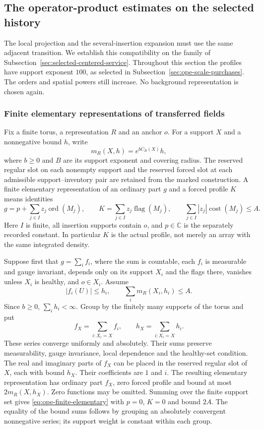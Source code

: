 \subsection{The operator-product estimates on the selected history}
\label{sec:ope-history-service}

The local projection and the several-insertion expansion must use the
same adjacent transition. We establish this compatibility on the family
of Subsection~\ref{sec:selected-centered-service}. Throughout this section
the profiles have support exponent $100$, as selected in
Subsection~\ref{sec:ope-scale-purchases}. The orders and spatial powers
still increase. No background representation is chosen again.

\subsubsection{Finite elementary representations of transferred fields}

Fix a finite torus, a representation $R$ and an anchor $o$. For a support
$X$ and a nonnegative bound $h$, write
\[
                  m_R(X,h)=e^{b C_B(X)}h,
\]
where $b\ge0$ and $B$ are its support exponent and covering radius.
The reserved regular slot on each nonempty support and the reserved
forced slot at each admissible support--inventory pair are retained
from the marked construction. A finite elementary representation of
an ordinary part $g$ and a forced profile $K$ means identities
\begin{equation}\label{eq:ope-finite-elementary}
 g=p+\sum_{j\in I}z_j\operatorname{ord}(M_j),\qquad
 K=\sum_{j\in I}z_j\operatorname{flag}(M_j),\qquad
 \sum_{j\in I}|z_j|\operatorname{cost}(M_j)\le A.
\end{equation}
Here $I$ is finite, all insertion supports contain $o$, and $p\in\mathbb C$
is the separately recorded constant. In particular $K$ is the actual
profile, not merely an array with the same integrated density.

Suppose first that $g=\sum_i f_i$, where the sum is countable, each
$f_i$ is measurable and gauge invariant, depends only on its support
$X_i$ and the flags there, vanishes unless $X_i$ is healthy, and
$o\in X_i$. Assume
\[
       |f_i(U)|\le h_i,\qquad
                   \sum_i m_R(X_i,h_i)\le A.
\]
Since $b\ge0$, $\sum_i h_i<\infty$. Group by the finitely many
supports of the torus and put
\[
 f_X=\sum_{i:X_i=X}f_i,\qquad h_X=\sum_{i:X_i=X}h_i.
\]
These series converge uniformly and absolutely. Their sums preserve
measurability, gauge invariance, local dependence and the healthy-set
condition. The real and imaginary parts of $f_X$ can be placed in
the reserved regular slot of $X$, each with bound $h_X$. Their
coefficients are $1$ and $i$. The resulting elementary representation
has ordinary part $f_X$, zero forced profile and bound at most
$2m_R(X,h_X)$. Zero functions may be omitted. Summing over the finite
support set gives \eqref{eq:ope-finite-elementary} with $p=0$, $K=0$
and bound $2A$. The equality of the bound sums follows by grouping
an absolutely convergent nonnegative series; its support weight is
constant within each group.

